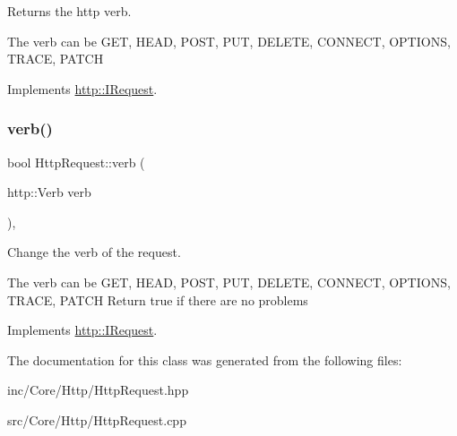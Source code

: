 Returns the http verb. 

The verb can be G\+ET, H\+E\+AD, P\+O\+ST, P\+UT, D\+E\+L\+E\+TE, C\+O\+N\+N\+E\+CT, O\+P\+T\+I\+O\+NS, T\+R\+A\+CE, P\+A\+T\+CH 

Implements \hyperlink{structhttp_1_1IRequest_aef9304b69674a5c9873a33564b51d527}{http\+::\+I\+Request}.

\mbox{\label{classHttpRequest_a243897d5dd8ba0195ce0acb6e9dd79ae}} 
\subsubsection{\texorpdfstring{verb()}{verb()}\hspace{0.1cm}{\footnotesize\ttfamily [2/2]}}
{\footnotesize\ttfamily bool Http\+Request\+::verb (\begin{DoxyParamCaption}\item[{http\+::\+Verb}]{verb }\end{DoxyParamCaption})\hspace{0.3cm}{\ttfamily [virtual]}, {\ttfamily [noexcept]}}



Change the verb of the request. 

The verb can be G\+ET, H\+E\+AD, P\+O\+ST, P\+UT, D\+E\+L\+E\+TE, C\+O\+N\+N\+E\+CT, O\+P\+T\+I\+O\+NS, T\+R\+A\+CE, P\+A\+T\+CH Return true if there are no problems 

Implements \hyperlink{structhttp_1_1IRequest_abcb6f9f77b7d800677e9af3728500fa8}{http\+::\+I\+Request}.



The documentation for this class was generated from the following files\+:\begin{DoxyCompactItemize}
\item 
inc/\+Core/\+Http/Http\+Request.\+hpp\item 
src/\+Core/\+Http/Http\+Request.\+cpp\end{DoxyCompactItemize}
